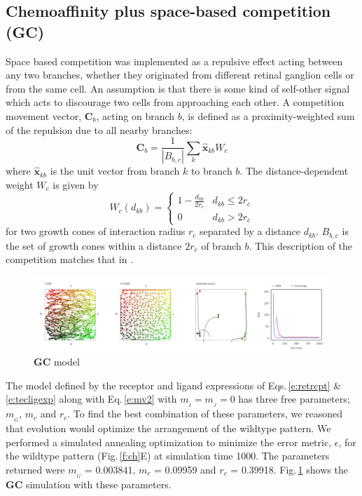 \documentclass[11pt, a4paper]{article}
\begin{document}
\subsection*{Chemoaffinity plus space-based competition (GC)}

Space based competition was implemented as a repulsive effect acting between
any two branches, whether they originated from different retinal ganglion
cells or from the same cell. An assumption is that there is some kind of
self-other signal which acts to discourage two cells from approaching each
other. A competition movement vector, $\mathbf{C}_b$, acting on branch $b$, is
defined as a proximity-weighted sum of the repulsion due to all nearby branches:
%
\begin{equation}
\mathbf{C}_b = \frac{1}{|B_{b,c}|} \sum_k \hat{\mathbf{x}}_{kb} W_c
\end{equation}
where $\hat{\mathbf{x}}_{kb}$ is the unit vector from branch $k$ to branch
$b$. The distance-dependent weight $W_c$ is given by
\begin{equation}
W_c(d_{kb}) = \begin{cases}
      1 - \frac{d_{kb}}{2r_c}   & d_{kb} \leq 2r_c \\
     0 & d_{kb} > 2r_c
     \end{cases}
\end{equation}
for two growth cones of interaction radius $r_c$ separated by a distance
$d_{kb}$. $B_{b,c}$ is the set of growth cones within a distance $2r_c$ of
branch $b$. This description of the competition matches that
in \citet{simpson_simple_2011}.

\begin{figure}
\includegraphics[width=\linewidth]{./images/j4_ee_GC_best_1_wt_figcomp1.png}
\caption{$\mathbf{GC}$ model}
\label{f:GC}
\end{figure}

The model defined by the receptor and ligand expressions of Eqs.\,\ref{e:retrcpt}
\& \ref{e:tecligexp} along with Eq.\,\ref{e:mv2} with $m_{\!_I}=m_{\!_J}=0$ has three
free parameters; $m_{\!_G}$, $m_c$ and $r_c$. To find the best combination of
these parameters, we reasoned that evolution would optimize the arrangement of
the wildtype pattern. We performed a simulated annealing optimization to
minimize the error metric, $\epsilon$, for the wildtype pattern
(Fig.\,\ref{f:ch}E) at simulation time 1000. The parameters returned were
$m_{\!_G}$ = 0.003841, $m_c$ = 0.09959 and $r_c$ = 0.39918. Fig.\,\ref{f:GC}
shows the $\mathbf{GC}$ simulation with these parameters.
\end{document}
